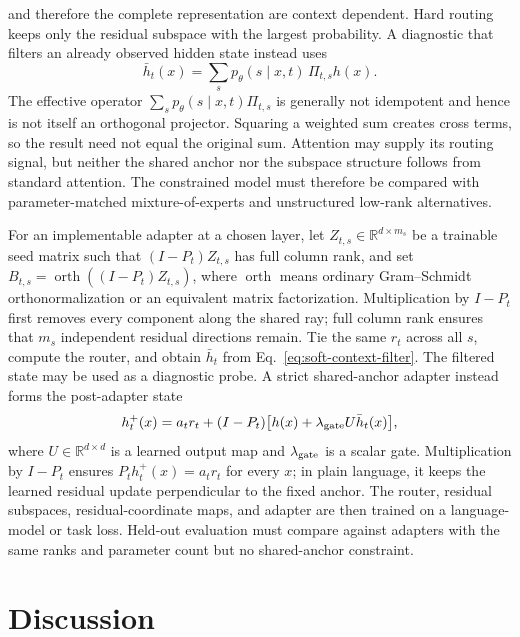 \documentclass[
  aps,
  reprint,
  superscriptaddress,
  floatfix,
  nofootinbib,
  longbibliography
]{revtex4-2}
\newcommand{\R}{\mathbb{R}}
\begin{document}
and therefore the complete representation are context dependent.  Hard routing
keeps only the residual subspace with the largest probability.  A diagnostic that filters
an already observed hidden state instead uses
%
\begin{equation}
\label{eq:soft-context-filter}
\bar h_t(x)=\sum_s p_\theta(s\mid x,t)\,\Pi_{t,s}h(x).
\end{equation}
%
The effective operator
$\sum_s p_\theta(s\mid x,t)\Pi_{t,s}$ is generally not idempotent and hence is
not itself an orthogonal projector.  Squaring a weighted sum creates cross
terms, so the result need not equal the original sum.  Attention may supply its routing signal,
but neither the shared anchor nor the subspace structure follows from standard
attention.  The constrained model must therefore be compared with
parameter-matched mixture-of-experts and unstructured low-rank alternatives.

For an implementable adapter at a chosen layer, let
$Z_{t,s}\in\R^{d\times m_s}$ be a trainable seed matrix such that
$(I-P_t)Z_{t,s}$ has full column rank, and set
$B_{t,s}=\operatorname{orth}((I-P_t)Z_{t,s})$, where
$\operatorname{orth}$ means ordinary Gram--Schmidt orthonormalization or an
equivalent matrix factorization.
Multiplication by $I-P_t$ first removes every component along the shared ray;
full column rank ensures that $m_s$ independent residual directions remain.
Tie the same $r_t$ across all $s$, compute the router, and obtain $\bar h_t$
from Eq.~\eqref{eq:soft-context-filter}.  The filtered state may be used as a
diagnostic probe.  A strict shared-anchor adapter instead forms the
post-adapter state
%
\begin{equation}
\label{eq:strict-anchor-update}
h_t^+(x)=a_t r_t+(I-P_t)\bigl[h(x)+\lambda_{\rm gate}U\bar h_t(x)\bigr],
\end{equation}
%
where $U\in\R^{d\times d}$ is a learned output map and $\lambda_{\rm gate}$ is
a scalar gate.
Multiplication by $I-P_t$ ensures $P_t h_t^+(x)=a_t r_t$ for every $x$; in plain
language, it keeps the learned residual update perpendicular to the fixed
anchor.  The router, residual subspaces, residual-coordinate maps, and adapter are then
trained on a language-model or task loss.  Held-out evaluation must compare
against adapters with the same ranks and parameter count but no shared-anchor
constraint.

\section{Discussion}
\label{sec:discussion}
\end{document}
